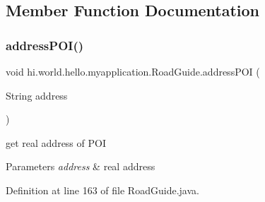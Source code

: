 \begin{DoxyCode}{0}

\end{DoxyCode}


\subsection{Member Function Documentation}
\mbox{\label{classhi_1_1world_1_1hello_1_1myapplication_1_1_road_guide_ae6a5b107e6391950548cb7f5c82eb728}} 
\subsubsection{\texorpdfstring{addressPOI()}{addressPOI()}}
{\footnotesize\ttfamily void hi.\+world.\+hello.\+myapplication.\+Road\+Guide.\+address\+P\+OI (\begin{DoxyParamCaption}\item[{String}]{address }\end{DoxyParamCaption})\hspace{0.3cm}{\ttfamily [private]}}



get real address of P\+OI 


\begin{DoxyParams}{Parameters}
{\em address} & real address \\
\hline
\end{DoxyParams}


Definition at line 163 of file Road\+Guide.\+java.


